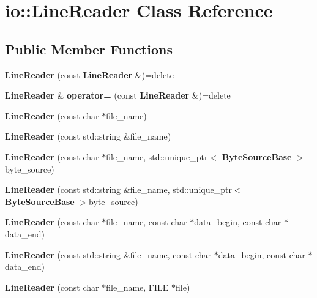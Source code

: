 \section{io\+:\+:Line\+Reader Class Reference}
\label{classio_1_1_line_reader}
\subsection*{Public Member Functions}
\begin{DoxyCompactItemize}
\item 
{\bfseries Line\+Reader} (const {\bf Line\+Reader} \&)=delete\label{classio_1_1_line_reader_a84f2957de769bb701eaaddfd8bc004dd}

\item 
{\bf Line\+Reader} \& {\bfseries operator=} (const {\bf Line\+Reader} \&)=delete\label{classio_1_1_line_reader_a9ebd7beca16060ffc0ea8df3c0c6ff25}

\item 
{\bfseries Line\+Reader} (const char $\ast$file\+\_\+name)\label{classio_1_1_line_reader_a81a75d3f53725d35822f490007520e29}

\item 
{\bfseries Line\+Reader} (const std\+::string \&file\+\_\+name)\label{classio_1_1_line_reader_ab0eb26f44fa6b18f9c39dfb2561ac882}

\item 
{\bfseries Line\+Reader} (const char $\ast$file\+\_\+name, std\+::unique\+\_\+ptr$<$ {\bf Byte\+Source\+Base} $>$byte\+\_\+source)\label{classio_1_1_line_reader_af4ebb130a7d6c78356573f6d0304266c}

\item 
{\bfseries Line\+Reader} (const std\+::string \&file\+\_\+name, std\+::unique\+\_\+ptr$<$ {\bf Byte\+Source\+Base} $>$byte\+\_\+source)\label{classio_1_1_line_reader_ab625b3a8001dca811b0e211c6cfc1b28}

\item 
{\bfseries Line\+Reader} (const char $\ast$file\+\_\+name, const char $\ast$data\+\_\+begin, const char $\ast$data\+\_\+end)\label{classio_1_1_line_reader_ad5a65d6f23474884061a77ea858c042b}

\item 
{\bfseries Line\+Reader} (const std\+::string \&file\+\_\+name, const char $\ast$data\+\_\+begin, const char $\ast$data\+\_\+end)\label{classio_1_1_line_reader_a0a52d864b46442a253443cac1367366e}

\item 
{\bfseries Line\+Reader} (const char $\ast$file\+\_\+name, F\+I\+LE $\ast$file)\label{classio_1_1_line_reader_ad2a8943ba0848ae5052e2f5ad30c010e}


\end{DoxyCompactItemize}
